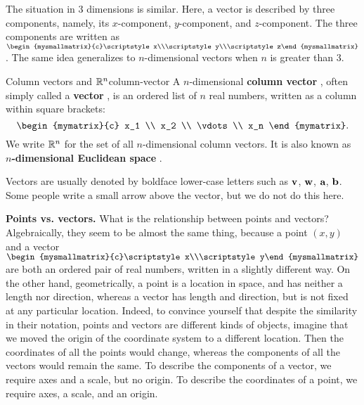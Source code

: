 The situation in $3$ dimensions is similar. Here, a vector is
described by three components, namely, its $x$-component,
$y$-component, and $z$-component. The three components are written as
$\begin{mysmallmatrix}{c}\scriptstyle x\\\scriptstyle y\\\scriptstyle
  z\end{mysmallmatrix}$. The same idea generalizes to $n$-dimensional
vectors when $n$ is greater than $3$.

\begin{definition}{Column vectors and $\mathbb{R}^n$}{column-vector}
  A $n$-dimensional%
   \textbf{column vector}%
  , often simply called a \textbf{vector}%
  , is an ordered list of $n$ real numbers, written as a
  column within square brackets:
  \begin{equation*}
    \begin{mymatrix}{c}
      x_1 \\
      x_2 \\
      \vdots \\
      x_n
    \end{mymatrix}.
  \end{equation*}
  We write $\mathbb{R}^n$%
   for the set of all $n$-dimensional column
  vectors. It is also known as \textbf{$n$-dimensional Euclidean
    space}%
  .
\end{definition}
Vectors are usually denoted by boldface lower-case letters such as
$\vect{v}$, $\vect{w}$, $\vect{a}$, $\vect{b}$. Some people write a
small arrow above the vector, but we do not do this here.
\bigskip

\noindent\textbf{Points vs. vectors.}
What is the relationship between points and vectors? Algebraically,
they seem to be almost the same thing, because a point $(x,y)$ and a
vector
$\begin{mysmallmatrix}{c}\scriptstyle x\\\scriptstyle
  y\end{mysmallmatrix}$ are both an ordered pair of real numbers,
written in a slightly different way. On the other hand, geometrically,
a point is a location in space, and has neither a length nor
direction, whereas a vector has length and direction, but is not fixed
at any particular location. Indeed, to convince yourself that despite
the similarity in their notation, points and vectors are different
kinds of objects, imagine that we moved the origin of the coordinate
system to a different location. Then the coordinates of all the points
would change, whereas the components of all the vectors would remain
the same. To describe the components of a vector, we require axes and
a scale, but no origin. To describe the coordinates of a point, we
require axes, a scale, and an origin.  \bigskip

